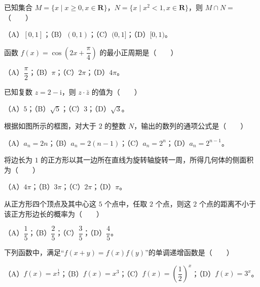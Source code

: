 \begin{question}
已知集合 $M=\{x\mid x\geqslant 0,x\in\mathbf R\}$，$N=\{x\mid x^2<1,x\in\mathbf R\}$，则 $M\cap N=$\mbox{（　　）}

（A）$[0,1]$；（B）$(0,1)$；（C）$(0,1]$；（D）$[0,1)$。

\end{question}
\begin{question}
函数 $f(x)=\cos\left(2x+\dfrac\pi4\right)$ 的最小正周期是\mbox{（　　）}

（A）$\dfrac\pi2$；（B）$\pi$；（C）$2\pi$；（D）$4\pi$。

\end{question}
\begin{question}
已知复数 $z=2-\mathrm i$，则 $z\cdot\bar z$ 的值为\mbox{（　　）}

（A）$5$；（B）$\sqrt5$；（C）$3$；（D）$\sqrt3$。

\Needspace{0.4\textheight}
\end{question}
\begin{question}
根据如图所示的框图，对大于 $2$ 的整数 $N$，输出的数列的通项公式是\mbox{（　　）}
\nopagebreak[4]
\begin{center}\end{center}
\nopagebreak[4]
（A）$a_n=2n$；（B）$a_n=2(n-1)$；（C）$a_n=2^n$；（D）$a_n=2^{n-1}$。

\end{question}
\begin{question}
将边长为 $1$ 的正方形以其一边所在直线为旋转轴旋转一周，所得几何体的侧面积为\mbox{（　　）}

（A）$4\pi$；（B）$3\pi$；（C）$2\pi$；（D）$\pi$。

\end{question}
\begin{question}
从正方形四个顶点及其中心这 $5$ 个点中，任取 $2$ 个点，则这 $2$ 个点的距离不小于该正方形边长的概率为\mbox{（　　）}

（A）$\dfrac15$；（B）$\dfrac25$；（C）$\dfrac35$；（D）$\dfrac45$。

\end{question}
\begin{question}
下列函数中，满足“$f(x+y)=f(x)f(y)$”的单调递增函数是\mbox{（　　）}

（A）$f(x)=x^{\frac12}$；（B）$f(x)=x^3$；（C）$f(x)=\left(\dfrac12\right)^x$；（D）$f(x)=3^x$。

\end{question}
